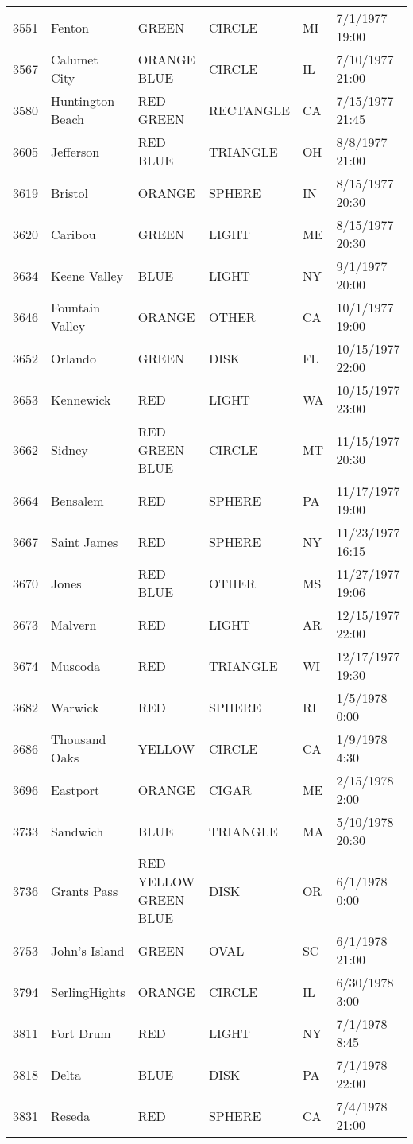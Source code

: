 \begin{tabular}{llllll}
3551 & Fenton & GREEN & CIRCLE & MI & 7/1/1977 19:00 \\
3567 & Calumet City & ORANGE BLUE & CIRCLE & IL & 7/10/1977 21:00 \\
3580 & Huntington Beach & RED GREEN & RECTANGLE & CA & 7/15/1977 21:45 \\
3605 & Jefferson & RED BLUE & TRIANGLE & OH & 8/8/1977 21:00 \\
3619 & Bristol & ORANGE & SPHERE & IN & 8/15/1977 20:30 \\
3620 & Caribou & GREEN & LIGHT & ME & 8/15/1977 20:30 \\
3634 & Keene Valley & BLUE & LIGHT & NY & 9/1/1977 20:00 \\
3646 & Fountain Valley & ORANGE & OTHER & CA & 10/1/1977 19:00 \\
3652 & Orlando & GREEN & DISK & FL & 10/15/1977 22:00 \\
3653 & Kennewick & RED & LIGHT & WA & 10/15/1977 23:00 \\
3662 & Sidney & RED GREEN BLUE & CIRCLE & MT & 11/15/1977 20:30 \\
3664 & Bensalem & RED & SPHERE & PA & 11/17/1977 19:00 \\
3667 & Saint James & RED & SPHERE & NY & 11/23/1977 16:15 \\
3670 & Jones & RED BLUE & OTHER & MS & 11/27/1977 19:06 \\
3673 & Malvern & RED & LIGHT & AR & 12/15/1977 22:00 \\
3674 & Muscoda & RED & TRIANGLE & WI & 12/17/1977 19:30 \\
3682 & Warwick & RED & SPHERE & RI & 1/5/1978 0:00 \\
3686 & Thousand Oaks & YELLOW & CIRCLE & CA & 1/9/1978 4:30 \\
3696 & Eastport & ORANGE & CIGAR & ME & 2/15/1978 2:00 \\
3733 & Sandwich & BLUE & TRIANGLE & MA & 5/10/1978 20:30 \\
3736 & Grants Pass & RED YELLOW GREEN BLUE & DISK & OR & 6/1/1978 0:00 \\
3753 & John's Island & GREEN & OVAL & SC & 6/1/1978 21:00 \\
3794 & SerlingHights & ORANGE & CIRCLE & IL & 6/30/1978 3:00 \\
3811 & Fort Drum & RED & LIGHT & NY & 7/1/1978 8:45 \\
3818 & Delta & BLUE & DISK & PA & 7/1/1978 22:00 \\
3831 & Reseda & RED & SPHERE & CA & 7/4/1978 21:00 \\

\end{tabular}
